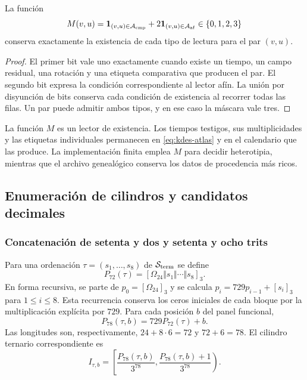 \begin{proposition}
La función
\[
 M(v,u)=\mathbf1_{(v,u)\in\mathcal A_{\rm cmp}}
        +2\mathbf1_{(v,u)\in\mathcal A_{\rm af}}
        \in\{0,1,2,3\}
\]
conserva exactamente la existencia de cada tipo de lectura para el par
$(v,u)$.
\end{proposition}
\begin{proof}
El primer bit vale uno exactamente cuando existe un tiempo, un campo
residual, una rotación y una etiqueta comparativa que producen el par.
El segundo bit expresa la condición correspondiente al lector afín.
La unión por disyunción de bits conserva cada condición de existencia
al recorrer todas las filas. Un par puede admitir ambos tipos, y en ese
caso la máscara vale tres.
\end{proof}

La función $M$ es un lector de existencia. Los tiempos testigos, sus
multiplicidades y las etiquetas individuales permanecen en
\eqref{eq:kdes-atlas} y en el calendario que las produce. La
implementación finita emplea $M$ para decidir heterotipia, mientras que
el archivo genealógico conserva los datos de procedencia más ricos.

\subsection{Enumeración de cilindros y candidatos decimales}

\subsubsection{Concatenación de setenta y dos y setenta y ocho trits}

Para una ordenación $\tau=(s_1,\ldots,s_8)$ de
$\mathcal S_{\rm term}$ se define
\[
 P_{72}(\tau)=[\Omega_{24}\Vert s_1\Vert\cdots\Vert s_8]_3.
\]
En forma recursiva, se parte de $p_0=[\Omega_{24}]_3$ y se calcula
$p_i=729p_{i-1}+[s_i]_3$ para $1\leq i\leq8$. Esta recurrencia
conserva los ceros iniciales de cada bloque por la multiplicación
explícita por $729$. Para cada posición $b$ del panel funcional,
\[
 P_{78}(\tau,b)=729P_{72}(\tau)+b.
\]
Las longitudes son, respectivamente, $24+8\cdot6=72$ y $72+6=78$.
El cilindro ternario correspondiente es
\begin{equation}
 I_{\tau,b}=
 \left[\frac{P_{78}(\tau,b)}{3^{78}},
       \frac{P_{78}(\tau,b)+1}{3^{78}}\right).
 \label{eq:kdes-cilindro}
\end{equation}

